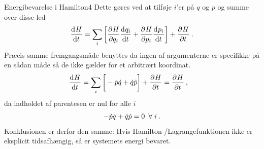 \begin{opgave}{Energibevarelse i Hamilton}{4}
\opg Dette gøres ved at tilføje $i$'er på $q$ og $p$ og summe over disse led
\begin{align*}
	\dif{t}{H} = \sum_i\left[\pdif{q_i}{H}\dif{t}{q_i} + \pdif{p_i}{H}\dif{t}{p_i}\right] + \pdif{t}{H} \: .
\end{align*}
Præcis samme fremgangsmåde benyttes da ingen af argumenterne er specifikke på en sådan måde så de ikke gælder for et arbitrært koordinat.
\begin{align*}
	\dif{t}{H} &= \sum_i\bigg[-\dt{p}\dt{q} + \dt{q}\dt{p}\bigg] + \pdif{t}{H} = \pdif{t}{H} \: ,
\end{align*}
da indholdet af parentesen er nul for alle $i$
\begin{align*}
	-\dt{p}\dt{q} + \dt{q}\dt{p} = 0 \enspace \forall \; i \: .
\end{align*}
Konklusionen er derfor den samme: Hvis Hamilton-/Lagrangefunktionen ikke er eksplicit tidsafhængig, så er systemets energi bevaret.
\end{opgave}